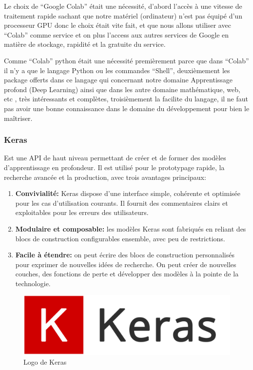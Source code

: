 \documentclass[12pt]{article}
\begin{document}
Le choix de “Google Colab” était une nécessité, d’abord l’accès à une vitesse de traitement rapide sachant que notre matériel (ordinateur) n’est pas équipé d’un processeur GPU donc le choix était vite fait, et que nous allons utiliser avec “Colab” comme service et on plus l’access aux autres services de Google en matière de stockage, rapidité et la gratuite du service.

Comme “Colab” python était une nécessité premièrement parce que dans “Colab” il n'y a que le langage Python ou les commandes “Shell”,  deuxièmement les package offerts  dans ce langage qui concernant notre domaine Apprentissage profond (Deep Learning) ainsi que dans les autre domaine mathématique, web, etc , très intéressants et complètes,  troisièmement la facilite du langage, il ne faut pas avoir une bonne connaissance dans le domaine du développement pour bien le maîtriser.

\subsubsection*{Keras}
Est une API de haut niveau permettant de créer et de former des modèles d'apprentissage en profondeur. Il est utilisé pour le prototypage rapide, la recherche avancée et la production, avec trois avantages principaux:
\begin{enumerate}
	\item \textbf{Convivialité:} Keras dispose d'une interface simple, cohérente et optimisée pour les cas d'utilisation courants. Il fournit des commentaires clairs et exploitables pour les erreurs des utilisateurs.
	\item \textbf{Modulaire et composable:} les modèles Keras sont fabriqués en reliant des blocs de construction configurables ensemble, avec peu de restrictions.
	\item \textbf{Facile à étendre:} on peut écrire des blocs de construction personnalisés pour exprimer de nouvelles idées de recherche. On peut créer de nouvelles couches, des fonctions de perte et développer des modèles à la pointe de la technologie.
\end{enumerate}

\newpage
\begin{figure}[h]
	\centering
	\includegraphics[width=12cm]{img-Chapiter-4/keras.png}
	\caption{Logo de Keras}
\end{figure}
\end{document}
